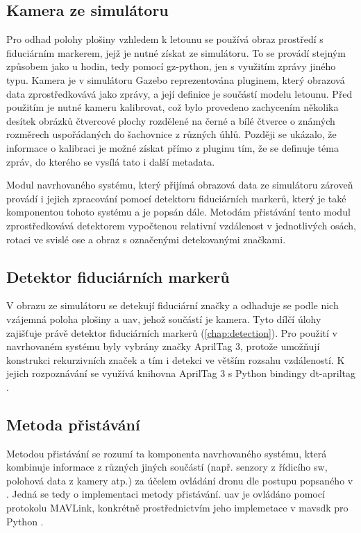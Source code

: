     \subsection{Kamera ze simulátoru}
      Pro odhad polohy plošiny vzhledem k letounu se používá obraz prostředí s fiduciárním markerem, jejž je nutné získat ze simulátoru. To se provádí stejným způsobem jako u hodin, tedy pomocí gz-python, jen s využitím zprávy jiného typu. Kamera je v simulátoru Gazebo reprezentována pluginem, který obrazová data zprostředkovává jako zprávy, a její definice je součástí modelu letounu. Před použitím je nutné kameru kalibrovat, což bylo provedeno zachycením několika desítek obrázků čtvercové plochy rozdělené na černé a bílé čtverce o známých rozměrech uspořádaných do šachovnice z různých úhlů. Později se ukázalo, že informace o kalibraci je možné získat přímo z pluginu tím, že se definuje téma zpráv, do kterého se vysílá tato i další metadata.

      Modul navrhovaného systému, který přijímá obrazová data ze simulátoru zároveň provádí i jejich zpracování pomocí detektoru fiduciárních markerů, který je také komponentou tohoto systému a je popsán dále. Metodám přistávání tento modul zprostředkovává detektorem vypočtenou relativní vzdálenost v jednotlivých osách, rotaci ve svislé ose a obraz s označenými detekovanými značkami.
    \subsection{Detektor fiduciárních markerů}
      V obrazu ze simulátoru se detekují fiduciární značky a odhaduje se podle nich vzájemná poloha plošiny a \acrshort{uav}, jehož součástí je kamera. Tyto dílčí úlohy zajišťuje právě detektor fiduciárních markerů (\cref{chap:detection}). Pro použití v navrhovaném systému byly vybrány značky AprilTag 3, protože umožňují konstrukci rekurzivních značek a tím i detekci ve větším rozsahu vzdáleností. K jejich rozpoznávání se využívá knihovna AprilTag 3 \cite{apriltag3} s Python bindingy dt-apriltag \cite{dt-apriltags}.
    \subsection{Metoda přistávání}
      Metodou přistávání se rozumí ta komponenta navrhovaného systému, která kombinuje informace z různých jiných součástí (např. senzory z řídicího \acrshort{sw}, polohová data z kamery atp.) za účelem ovládání dronu dle postupu popsaného v . Jedná se tedy o implementaci metody přistávání. \Acrshort{uav} je ovládáno pomocí protokolu MAVLink, konkrétně prostřednictvím jeho implemetace v mavsdk pro Python \cite{mavsdk}.
